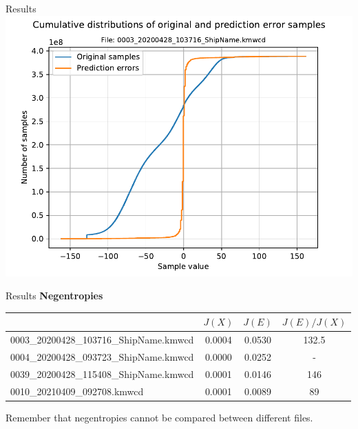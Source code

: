 \documentclass[usenames,dvipsnames]{beamer}
\begin{document}
\begin{frame}{Results}
\centering
\includegraphics[scale=0.62]{graphics/0003_20200428_103716_ShipName.kmwcd_hist_cum.pdf}
\end{frame}

\begin{frame}{Results}
\textbf{Negentropies}
\vspace{1em}

\footnotesize
\begin{tabular}{|l|c|c|c|}
	\hline
	\rowcolor[HTML]{d6cefc} 
	\multicolumn{1}{|c|}{\cellcolor[HTML]{d6cefc}Filename}         & $J(X)$                           & $J(E)$                           & $J(E)/J(X)$ \\ \hline
	0003\_20200428\_103716\_ShipName.kmwcd & 0.0004 & 0.0530 & 132.5     \\ \hline
	0004\_20200428\_093723\_ShipName.kmwcd & 0.0000      & 0.0252 & -         \\ \hline
	0039\_20200428\_115408\_ShipName.kmwcd & 0.0001 & 0.0146 & 146       \\ \hline
	0010\_20210409\_092708.kmwcd                                   & 0.0001                         & 0.0089                         & 89        \\ \hline
\end{tabular}
\normalsize
\vspace{1.5em}

Remember that negentropies cannot be compared between different files.
\end{frame}
\end{document}
